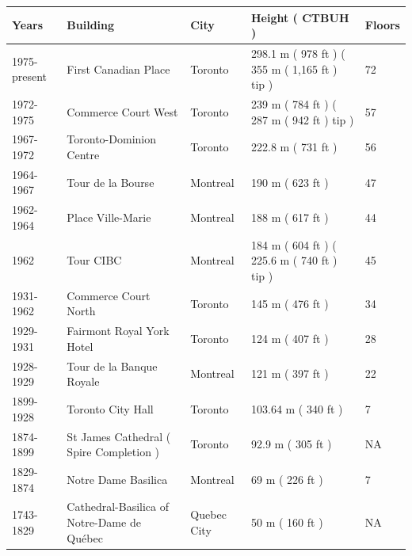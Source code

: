 \documentclass{article}
\begin{document}
\begin{tabular}{lllll}
\toprule
Years & Building & City & Height ( CTBUH ) & Floors \\
\midrule
1975-present & First Canadian Place & Toronto & 298.1 m ( 978 ft ) ( 355 m ( 1,165 ft ) tip ) & 72 \\
1972-1975 & Commerce Court West & Toronto & 239 m ( 784 ft ) ( 287 m ( 942 ft ) tip ) & 57 \\
1967-1972 & Toronto-Dominion Centre & Toronto & 222.8 m ( 731 ft ) & 56 \\
1964-1967 & Tour de la Bourse & Montreal & 190 m ( 623 ft ) & 47 \\
1962-1964 & Place Ville-Marie & Montreal & 188 m ( 617 ft ) & 44 \\
1962 & Tour CIBC & Montreal & 184 m ( 604 ft ) ( 225.6 m ( 740 ft ) tip ) & 45 \\
1931-1962 & Commerce Court North & Toronto & 145 m ( 476 ft ) & 34 \\
1929-1931 & Fairmont Royal York Hotel & Toronto & 124 m ( 407 ft ) & 28 \\
1928-1929 & Tour de la Banque Royale & Montreal & 121 m ( 397 ft ) & 22 \\
1899-1928 & Toronto City Hall & Toronto & 103.64 m ( 340 ft ) & 7 \\
1874-1899 & St James Cathedral ( Spire Completion ) & Toronto & 92.9 m ( 305 ft ) & NA \\
1829-1874 & Notre Dame Basilica & Montreal & 69 m ( 226 ft ) & 7 \\
1743-1829 & Cathedral-Basilica of Notre-Dame de Québec & Quebec City & 50 m ( 160 ft ) & NA \\
\bottomrule
\end{tabular}
\end{document}
